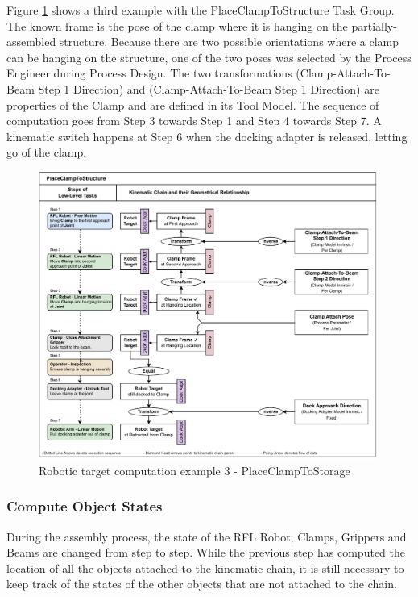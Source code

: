 Figure \ref{fig:chain-example-3} shows a third example with the PlaceClampToStructure Task Group. The known frame is the pose of the clamp where it is hanging on the partially-assembled structure. Because there are two possible orientations where a clamp can be hanging on the structure, one of the two poses was selected by the Process Engineer during Process Design. The two transformations (Clamp-Attach-To-Beam Step 1 Direction) and (Clamp-Attach-To-Beam Step 1 Direction) are properties of the Clamp and are defined in its Tool Model. The sequence of computation goes from Step 3 towards Step 1 and Step 4 towards Step 7. A kinematic switch happens at Step 6 when the docking adapter is released, letting go of the clamp. 

\begin{figure}[!h]
    \centering
    \includegraphics[width=0.99\textwidth]{images/6a/motion-placeclamptostructure.pdf}
    \caption{Robotic target computation example 3 - PlaceClampToStorage}
    \label{fig:chain-example-3}
\end{figure}

\FloatBarrier

\subsubsection{Compute Object States}
\label{subsubsection:exploration-3-compute-object-states}

During the assembly process, the state of the RFL Robot, Clamps, Grippers and Beams are changed from step to step. While the previous step has computed the location of all the objects attached to the kinematic chain, it is still necessary to keep track of the states of the other objects that are not attached to the chain.

